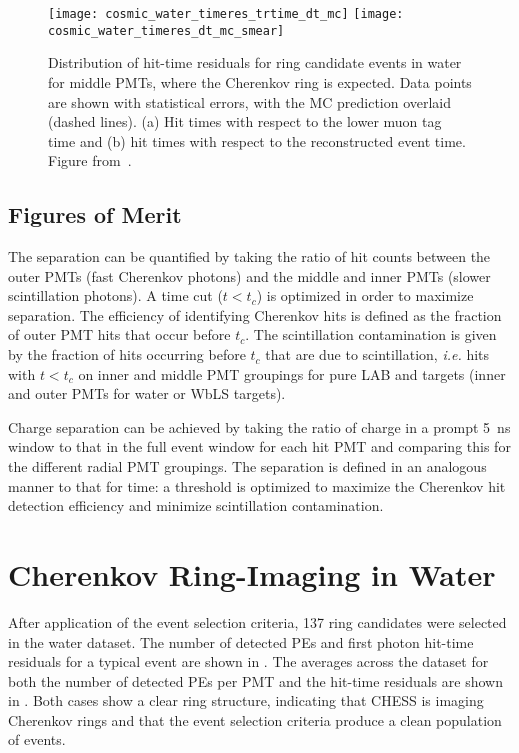\begin{figure}
\centering
\texttt{[image: cosmic\_water\_timeres\_trtime\_dt\_mc]}
\texttt{[image: cosmic\_water\_timeres\_dt\_mc\_smear]}
\caption{Distribution of hit-time residuals for ring candidate events in water for middle PMTs, where the Cherenkov ring is expected. Data points are shown with statistical errors, with the MC prediction overlaid (dashed lines). 
(a) Hit times with respect to the lower muon tag time and (b) hit times with respect to the reconstructed event time.
Figure from~\cite{chess_nim}.}
\label{f:smear}
\end{figure}

\subsection{Figures of Merit}

The separation can be quantified by taking the ratio of hit counts between the outer PMTs (fast Cherenkov photons) and the middle and inner PMTs (slower scintillation photons).  
A time cut ($t < t_c$) is optimized in order to maximize separation.  
The efficiency of identifying Cherenkov hits is defined as the fraction of outer PMT hits that occur before $t_c$.  
The scintillation contamination  is given by the fraction of hits occurring before $t_c$ that are due to scintillation, \textit{i.e.} hits with $t < t_c$ on inner and middle PMT groupings for pure LAB and {\labppo} targets (inner and outer PMTs for water or WbLS targets). 

Charge separation can be achieved by taking the ratio of charge in a prompt 5~ns window to that in the full event window for each hit PMT and comparing this for the different radial PMT groupings.  
The separation is defined in an analogous manner to that for time: a threshold is optimized to maximize the Cherenkov hit detection efficiency and minimize scintillation contamination.  

\clearpage

\section{Cherenkov Ring-Imaging in Water}

\label{sec:water}

After application of the event selection criteria, 137 ring candidates were selected in the water dataset.
The number of detected PEs and first photon hit-time residuals for a typical event are shown in . 
The averages across the dataset for both the number of detected PEs per PMT and the hit-time residuals are shown in .
Both cases show a clear ring structure, indicating that CHESS is imaging Cherenkov rings and that the event selection criteria produce a clean population of events. 


